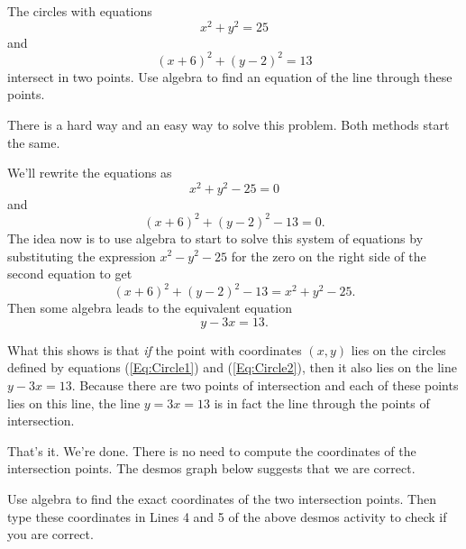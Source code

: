 \documentclass{ximera}
\begin{document}
\fi          %



\begin{example} \label{Ex4b}
The circles with equations
\[
    x^2 + y^2 = 25
\]
and 
\[
   (x+6)^2 + (y-2)^2=13
\]
intersect in two points. Use algebra to find an equation of the line through these points.
\end{example}

\begin{explanation}

There is a hard way and an easy way to solve this problem. Both methods start the same.

We'll rewrite the equations as
\begin{equation}
  x^2 + y^2 - 25 = 0   \label{Eq:Circle1}
\end{equation}
and
\begin{equation}
  (x+6)^2 + (y-2)^2-13 = 0 .   \label{Eq:Circle2}
\end{equation}
The idea now is to use algebra to start to solve this system of equations by substituting the expression $x^2-y^2-25$ for the zero on the right side of the second equation to get
\[
        (x+6)^2 + (y-2)^2-13 = x^2 + y^2 -25 .
\]
Then some algebra leads to the equivalent equation
\[
   y-3x = 13.
\]

What this shows is that \emph{if} the point with coordinates $(x,y)$ lies on the circles defined by equations (\ref{Eq:Circle1}) and (\ref{Eq:Circle2}), then it also lies on the line $y-3x = 13$. Because there are two points of intersection and each of these points lies on this line, the line $y=3x=13$ is in fact the line through the points of intersection.

That's it. We're done. There is no need to compute the coordinates of the intersection points. The desmos graph below suggests that we are correct.

\begin{onlineOnly}
    \begin{center}
\end{center}
\end{onlineOnly}


\begin{question}
Use algebra to find the exact coordinates of the two intersection points. Then type these coordinates in Lines 4 and 5 of the above desmos activity to check if you are correct. 
\end{question}

\end{explanation}
\end{document}
